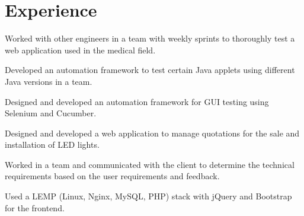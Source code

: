 \documentclass[letter]{deedy-resume} %
\begin{document}
\begin{minipage}[t]{0.66\textwidth} %


\section{Experience}


\vspace{\topsep} %
\begin{tightitemize}
\item Worked with other engineers in a team with weekly sprints to thoroughly test a web application used in the medical field.
\item Developed an automation framework to test certain Java applets using different Java versions in a team.
\item Designed and developed an automation framework for GUI testing using Selenium and Cucumber.
\end{tightitemize}

\sectionspace %



\begin{tightitemize}
\item Designed and developed a web application to manage quotations for the sale and installation of LED lights.
\item Worked in a team and communicated with the client to determine the technical requirements based on the user requirements and feedback.
\item Used a LEMP (Linux, Nginx, MySQL, PHP) stack with jQuery and Bootstrap for the frontend.
\end{tightitemize}

\sectionspace %




\end{minipage}
\end{document}
